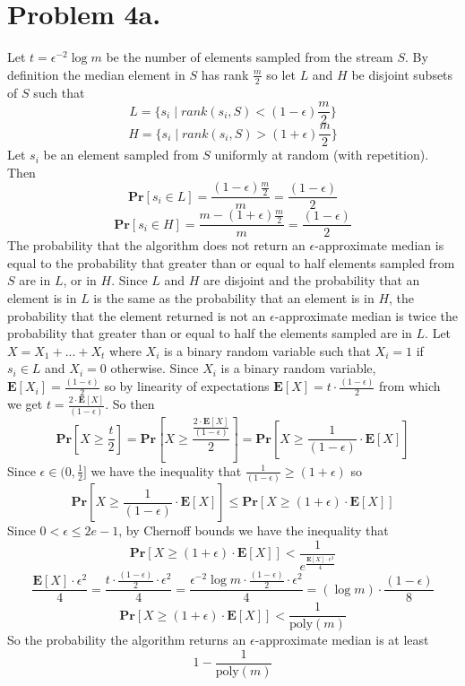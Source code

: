 \documentclass[12pt]{article}
\begin{document}
\section*{Problem 4a.}
Let $t=\epsilon^{-2} \log m$ be the number of elements
sampled from the stream $S$. By definition the median element in $S$ has rank
$\frac{m}{2}$ so let $L$ and $H$ be disjoint subsets of $S$ such that
$$L = \{s_i \mid rank(s_i, S) < (1-\epsilon)\frac{m}{2}\}$$
$$H = \{s_i \mid rank(s_i, S) > (1+\epsilon)\frac{m}{2}\}$$
Let $s_i$ be an element sampled from $S$ uniformly at random 
(with repetition). Then
$$\textbf{Pr}[s_i \in L] = \frac{(1-\epsilon)\frac{m}{2}}{m} =
\frac{(1-\epsilon)}{2}$$
$$\textbf{Pr}[s_i \in H] = \frac{m - (1+\epsilon)\frac{m}{2}}{m} =
\frac{(1-\epsilon)}{2}$$
The probability that the algorithm does not return an $\epsilon$-approximate
median is equal to the probability that greater than or equal to half
elements sampled from $S$ are in $L$, or in $H$. Since $L$ and $H$ are disjoint
and the probability that an element is in $L$ is the same as the probability
that an element is in $H$, the probability that the element returned
is not an $\epsilon$-approximate median is twice the probability that
greater than or equal to half the elements sampled are in $L$.
Let $X = X_1 + ... + X_t$ where $X_i$ is a binary random variable such
that $X_i = 1$ if $s_i \in L$ and $X_i = 0$ otherwise. Since $X_i$ is a binary
random variable, $\textbf{E}[X_i] = \frac{(1-\epsilon)}{2}$ so by linearity of
expectations $\textbf{E}[X] = t\cdot \frac{(1-\epsilon)}{2}$ from which we get
$t = \frac{2\cdot \textbf{E}[X]}{(1-\epsilon)}$. So then
$$\textbf{Pr}[X \ge \frac{t}{2}] =
\textbf{Pr}[X \ge \frac{\frac{2\cdot \textbf{E}[X]}{(1-\epsilon)}}{2}] =
\textbf{Pr}[X \ge \frac{1}{(1-\epsilon)}\cdot \textbf{E}[X]]$$
Since $\epsilon \in (0,\frac{1}{2}]$ we have the inequality that
$\frac{1}{(1-\epsilon)} \ge (1+\epsilon)$ so
$$\textbf{Pr}[X \ge \frac{1}{(1-\epsilon)}\cdot \textbf{E}[X]] \le
\textbf{Pr}[X \ge (1+\epsilon) \cdot \textbf{E}[X]]$$
Since $0 < \epsilon \le 2e - 1$, by Chernoff bounds we have the inequality that
$$\textbf{Pr}[X \ge (1+\epsilon) \cdot \textbf{E}[X]] <
\frac{1}{e^{\frac{\textbf{E}[X]\cdot \epsilon^2}{4}}}$$
$$\frac{\textbf{E}[X]\cdot \epsilon^2}{4} =
\frac{t\cdot \frac{(1-\epsilon)}{2} \cdot \epsilon^2}{4} =
\frac{\epsilon^{-2} \log m \cdot \frac{(1-\epsilon)}{2} \cdot \epsilon^2}{4} =
(\log m) \cdot \frac{(1-\epsilon)}{8}$$
$$\textbf{Pr}[X \ge (1+\epsilon) \cdot \textbf{E}[X]] <
\frac{1}{\text{poly}(m)}$$
So the probability the algorithm returns an $\epsilon$-approximate median is at
least $$1 - \frac{1}{\text{poly}(m)}$$
\end{document}
